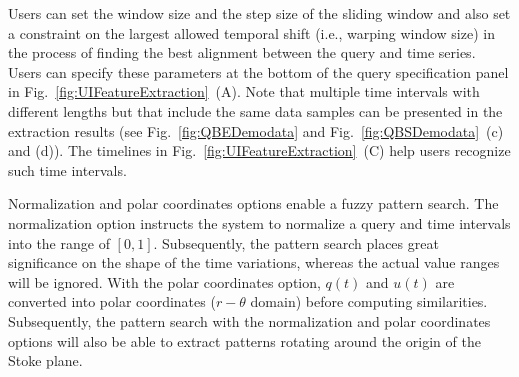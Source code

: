 Users can set the window size and the step size of the sliding window and also set a constraint on the largest allowed temporal shift (i.e., warping window size)
in the process of finding the best alignment between the query and time series.
Users can specify these parameters at the bottom of the query specification panel in Fig.~\ref{fig:UIFeatureExtraction}~(A).
Note that multiple time intervals with different lengths but that include the same data samples can be presented in the extraction results (see Fig.~\ref{fig:QBEDemodata} and Fig.~\ref{fig:QBSDemodata}~(c) and (d)). %
The timelines in Fig.~\ref{fig:UIFeatureExtraction}~(C) help users recognize such time intervals. 

Normalization and polar coordinates options enable a fuzzy pattern search.
The normalization option instructs the system to normalize a query and time intervals into the range of $[0, 1]$.
Subsequently, the pattern search places great significance on the shape of the time variations, whereas the actual value ranges will be ignored.
With the polar coordinates option, 
$q(t)$ and $u(t)$ are converted into polar coordinates ($r-\theta$ domain) before computing similarities.
Subsequently, the pattern search with the normalization and polar coordinates options will also be able to extract patterns rotating around the origin of the Stoke plane.

%
%
